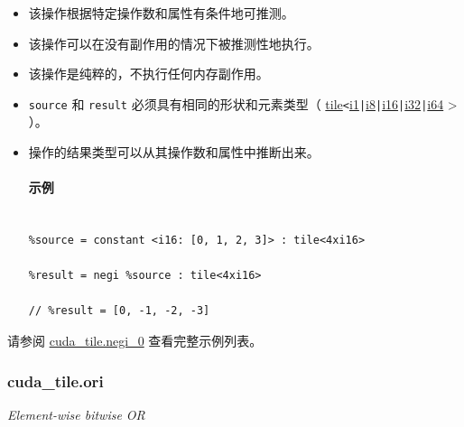 \documentclass{article}
\begin{document}
\begin{itemize}
\item 该操作根据特定操作数和属性有条件地可推测。
\item 该操作可以在没有副作用的情况下被推测性地执行。
\item 该操作是纯粹的，不执行任何内存副作用。
\item \texttt{source} 和 \texttt{result} 必须具有相同的形状和元素类型（ \href{https://docs.nvidia.com/cuda/tile-ir/latest/sections/types.html#type-tile}{tile}\texttt{<}\href{https://docs.nvidia.com/cuda/tile-ir/latest/sections/types.html#subsection-element-types}{i1}\texttt{|}\href{https://docs.nvidia.com/cuda/tile-ir/latest/sections/types.html#subsection-element-types}{i8}\texttt{|}\href{https://docs.nvidia.com/cuda/tile-ir/latest/sections/types.html#subsection-element-types}{i16}\texttt{|}\href{https://docs.nvidia.com/cuda/tile-ir/latest/sections/types.html#subsection-element-types}{i32}\texttt{|}\href{https://docs.nvidia.com/cuda/tile-ir/latest/sections/types.html#subsection-element-types}{i64} > ）。
\item 操作的结果类型可以从其操作数和属性中推断出来。




\paragraph{示例}


\begin{lstlisting}

%source = constant <i16: [0, 1, 2, 3]> : tile<4xi16>

%result = negi %source : tile<4xi16>

// %result = [0, -1, -2, -3]

\end{lstlisting}



\end{itemize}
请参阅 \href{https://docs.nvidia.com/cuda/tile-ir/latest/sections/appendix.html#example-cuda-tile-negi-0}{cuda\_tile.negi\_0} 查看完整示例列表。





\subsubsection{cuda\_tile.ori}


\textit{Element-wise bitwise OR}
\end{document}
